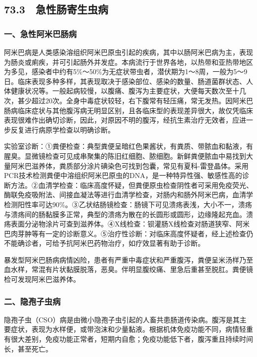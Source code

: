 \protect\hypertarget{text00185.html}{}{}

\subsection{73.3　急性肠寄生虫病}

\subsubsection{一、急性阿米巴肠病}

阿米巴病是人类感染溶组织阿米巴原虫引起的疾病，其中以肠阿米巴病为主，表现为肠炎或痢疾，并可引起肠外并发症。本病流行于世界各地，以热带和亚热带地区为多见，感染者中约有5\%～50\%为无症状带虫者，潜伏期为1～8周，一般为5～9日。临床表现多种多样，其表现取决于感染部位、感染的数量、肠道菌群状态、人体健康状况等。一般起病较慢，以腹痛、腹泻为主要症状，大便每天数次至十几次，甚少超过20次。全身中毒症状较轻，右下腹常有轻压痛，常无发热。因阿米巴肠病临床症状与其他腹泻病无明显区别，且各临床型的表现差异很大，故仅凭临床表现很难作出确切诊断，因此，对原因不明的腹泻，经抗生素治疗无效者，应进一步反复进行病原学检查以明确诊断。

实验室诊断：①粪便检查：典型粪便呈暗红色果酱状，有粪质、带脓血和黏液，有腥臭。显微镜检查可见成串聚集的陈旧红细胞、脓细胞。新鲜粪便脓血中易找到大量阿米巴滋养体，粪质部分涂片碘染色可找到包囊，常见有夏科-雷登晶体。采用PCR技术检测粪便中溶组织阿米巴原虫的DNA，是一种特异性强、敏感性高的诊断方法。②血清学检查：临床高度怀疑，但粪便原虫检查阴性者可采用免疫荧光、酶联免疫吸附法、间接血凝法等进行血清学检查，对肠内和肠外阿米巴病，血清学检测阳性率可达90\%。③乙状结肠镜检查：肠镜下可见溃疡表浅，大小不一，溃疡与溃疡间的肠黏膜多正常，典型的溃疡为散在的长圆形或圆形，边缘隆起充血。溃疡表面分泌物涂片可查到滋养体。④X线检查：钡灌肠X线检查对肠道狭窄、阿米巴肉芽肿等有一定的诊断意义。⑤治疗性诊断：对临床高度怀疑者，经上述检查仍不能确诊者，可给予抗阿米巴药物治疗，如疗效显著有助于诊断。

暴发型阿米巴肠病病情凶险，患者有严重中毒症状和严重腹泻，粪便呈米汤样乃至血水样，常混有片状黏膜脱落，恶臭。伴明显腹绞痛、里急后重甚至脱肛。粪便镜检可发现阿米巴滋养体。

\subsubsection{二、隐孢子虫病}

隐孢子虫（CSO）病是由微小隐孢子虫引起的人畜共患肠道传染病。腹泻是其主要症状，表现为水样便，或带泡沫和少量黏液。根据机体免疫功能不同，病情轻重有很大差别，免疫功能正常者，短期内自愈；免疫功能低下者，腹泻重且持续时间长，甚至死亡。

